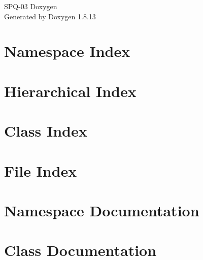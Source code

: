 \documentclass[twoside]{book}
\newcommand{\+}{\discretionary{\mbox{\scriptsize$\hookleftarrow$}}{}{}}
\newcommand{\clearemptydoublepage}{%
  \newpage{\pagestyle{empty}\cleardoublepage}%
}
\begin{document}
\hypersetup{pageanchor=false,
             bookmarksnumbered=true,
             pdfencoding=unicode
            }
\begin{titlepage}
\vspace*{7cm}
\begin{center}%
{\Large S\+P\+Q-\/03 Doxygen }\\
\vspace*{1cm}
{\large Generated by Doxygen 1.8.13}\\
\end{center}
\end{titlepage}
\clearemptydoublepage
{}
\tableofcontents
\clearemptydoublepage
{}
\hypersetup{pageanchor=true}

\chapter{Namespace Index}

\chapter{Hierarchical Index}

\chapter{Class Index}

\chapter{File Index}

\chapter{Namespace Documentation}








\chapter{Class Documentation}













\end{document}
